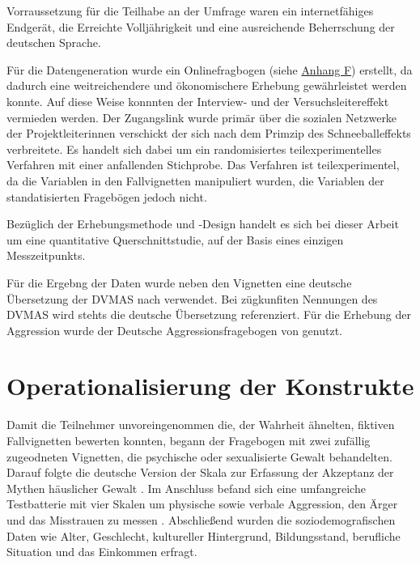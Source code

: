 Vorraussetzung für die Teilhabe an der Umfrage waren ein internetfähiges Endgerät, die Erreichte Volljährigkeit und eine ausreichende Beherrschung der deutschen Sprache. 

Für die Datengeneration wurde ein Onlinefragbogen (siehe \hyperref[Fragebogen]{Anhang F}) erstellt, da dadurch eine weitreichendere und ökonomischere Erhebung gewährleistet werden konnte. Auf diese Weise konnnten der Interview- und der Versuchsleitereffekt vermieden werden. Der Zugangslink wurde primär über die sozialen Netzwerke der Projektleiterinnen verschickt der sich nach dem Primzip des Schneeballeffekts verbreitete. Es handelt sich dabei um ein randomisiertes teilexperimentelles Verfahren mit einer anfallenden Stichprobe. Das Verfahren ist teilexperimentel, da die Variablen in den Fallvignetten manipuliert wurden, die Variablen der standatisierten Fragebögen jedoch nicht.

Bezüglich der Erhebungsmethode und -Design handelt es sich bei dieser Arbeit um eine quantitative Querschnittstudie, auf der Basis eines einzigen Messzeitpunkts.

Für die Ergebng der Daten wurde neben den Vignetten eine deutsche Übersetzung der DVMAS nach \textcite{Peters2003} verwendet. Bei zügkunfiten Nennungen des DVMAS wird stehts die deutsche Übersetzung referenziert. Für die Erhebung der Aggression wurde der Deutsche Aggressionsfragebogen von \textcite{Aggressionsfragebogen} genutzt.


\section{Operationalisierung der Konstrukte}    \label{sec_3.3}
Damit die Teilnehmer unvoreingenommen die, der Wahrheit ähnelten, fiktiven Fallvignetten bewerten konnten, begann der Fragebogen mit zwei zufällig zugeodneten Vignetten, die psychische oder sexualisierte Gewalt behandelten. Darauf folgte die deutsche Version der Skala zur Erfassung der Akzeptanz der Mythen häuslicher Gewalt \parencite{Peters2003}. Im Anschluss befand sich eine umfangreiche Testbatterie mit vier Skalen um physische sowie verbale Aggression, den Ärger und das Misstrauen zu messen \parencite{Aggressionsfragebogen}. Abschließend wurden die soziodemografischen Daten wie Alter, Geschlecht, kultureller Hintergrund, Bildungsstand, berufliche Situation und das Einkommen erfragt.

